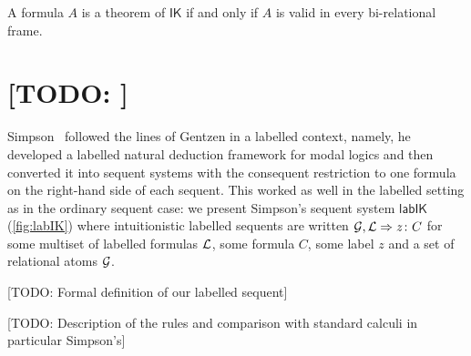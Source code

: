 \documentclass[twoside]{aiml18}
\newcommand{\todo}[1]{{\color{red}[TODO: #1]}}
\newcommand*{\lab}{\mathsf{lab}}
\newcommand*{\IK}{\mathsf{IK}}
\newcommand{\SEQ}{\Rightarrow}
\begin{document}
\begin{theorem}
	A formula $A$ is a theorem of $\IK$ if and only if $A$ is valid in every bi-relational frame.
\end{theorem}


\section{\todo{}}

Simpson~\cite{Simpson} followed the lines of Gentzen in a labelled context, namely, he developed a labelled natural deduction framework for modal logics and then converted it into sequent systems with the consequent restriction to one formula on the right-hand side of each sequent.
%
This worked as well in the labelled setting as in the ordinary sequent case: we present Simpson's sequent system $\lab\IK$ (\ref{fig:labIK}) where intuitionistic labelled sequents are written $\G, \Left \SEQ z \colon C$ for some multiset of labelled formulas $\mathcal{L}$, some formula $C$, some label $z$ and a set of relational atoms $\mathcal{G}$. 

\todo{Formal definition of our labelled sequent}

\todo{Description of the rules and comparison with standard calculi in particular Simpson's}
\end{document}
